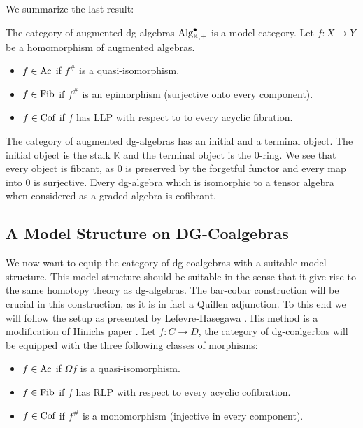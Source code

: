 \documentclass[../thesis.tex]{subfiles}
\begin{document}
            We summarize the last result:

            The category of augmented dg-algebras $\tt{Alg}^\bullet_{\mathbb{K},+}$ is a model category. Let $f:X\rightarrow Y$ be a homomorphism of augmented algebras. 
            \begin{itemize}
                \item $f\in \tt{Ac}$ if $f^\#$ is a quasi-isomorphism.
                \item $f\in \tt{Fib}$ if $f^\#$ is an epimorphism (surjective onto every component).
                \item $f\in \tt{Cof}$ if $f$ has LLP with respect to to every acyclic fibration.
            \end{itemize}
            
            The category of augmented dg-algebras has an initial and a terminal object. The initial object is the stalk $\overline{\mathbb{K}}$ and the terminal object is the $0$-ring. We see that every object is fibrant, as $0$ is preserved by the forgetful functor and every map into $0$ is surjective. Every dg-algebra which is isomorphic to a tensor algebra when considered as a graded algebra is cofibrant. 
            
    \subsection{A Model Structure on DG-Coalgebras}

            We now want to equip the category of dg-coalgebras with a suitable model structure. This model structure should be suitable in the sense that it give rise to the same homotopy theory as dg-algebras. The bar-cobar construction will be crucial in this construction, as it is in fact a Quillen adjunction. To this end we will follow the setup as presented by Lefevre-Hasegawa \cite{LefevreHasegawa03}. His method is a modification of Hinichs paper \cite{Hinich01}.
            Let $f: C \rightarrow D$, the category of dg-coalgerbas will be equipped with the three following classes of morphisms:
            \begin{itemize}
                \item $f\in \tt{Ac}$ if $\Omega f$ is a quasi-isomorphism.
                \item $f\in \tt{Fib}$ if $f$ has RLP with respect to every acyclic cofibration.
                \item $f\in \tt{Cof}$ if $f^\#$ is a monomorphism (injective in every component).
            \end{itemize}
\end{document}
